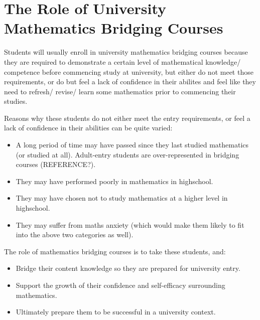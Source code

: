 \documentclass[twoside,12pt,a4paper]{report}
\begin{document}
\section{The Role of University Mathematics Bridging Courses}

Students will usually enroll in university mathematics bridging courses because they are required to demonstrate a certain level of mathematical knowledge/ competence before commencing study at university, but either do not meet those requirements, or do but feel a lack of confidence in their abilites and feel like they need to refresh/ revise/ learn some mathematics prior to commencing their studies.

Reasons why these students do not either meet the entry requirements, or feel a lack of confidence in their abilities can be quite varied:
\begin{itemize}
	\item A long period of time may have passed since they last studied mathematics (or studied at all). Adult-entry students are over-represented in bridging courses (REFERENCE?).
	\item They may have performed poorly in mathematics in highschool.
	\item They may have chosen not to study mathematics at a higher level in highschool.
	\item They may suffer from maths anxiety (which would make them likely to fit into the above two categories as well).
\end{itemize}
	
The role of mathematics bridging courses is to take these students, and:
\begin{itemize}
	\item Bridge their content knowledge so they are prepared for university entry.
	\item Support the growth of their confidence and self-efficacy surrounding mathematics.
	\item Ultimately prepare them to be successful in a university context.
\end{itemize}
\end{document}
